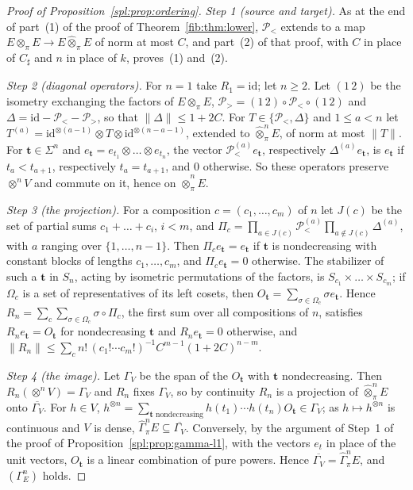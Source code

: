 \documentclass[11pt]{amsart}
\theoremstyle{definition}
\theoremstyle{remark}
\numberwithin{equation}{section}
\newcommand{\id}{\mathrm{id}}
\newcommand{\norm}[1]{\lVert #1\rVert}
\theoremstyle{plain}
\theoremstyle{definition}
\theoremstyle{plain}
\newcommand{\hGamma}{\widehat\Gamma}
\newcommand{\cP}{\mathcal P}
\begin{document}
\begin{proof}[Proof of Proposition~\ref{spl:prop:ordering}]
\emph{Step 1 (source and target).} As at the end of part~(1) of the proof of Theorem~\ref{fib:thm:lower}, $\cP_<$
extends to a map $E\otimes_\pi E\to E\widehat\otimes_\pi E$ of norm at most $C$, and part~(2) of that proof, with $C$ in
place of $C_\sharp$ and $n$ in place of $k$, proves~(1) and~(2).

\emph{Step 2 (diagonal operators).} For $n=1$ take $R_1=\id$; let $n\ge2$. Let $(1\,2)$ be the isometry exchanging the
factors of $E\otimes_\pi E$, $\cP_>=(1\,2)\circ\cP_<\circ(1\,2)$ and $\Delta=\id-\cP_<-\cP_>$, so that
$\norm\Delta\le1+2C$. For $T\in\{\cP_<,\Delta\}$ and $1\le a<n$ let
$T^{(a)}=\id^{\otimes(a-1)}\otimes T\otimes\id^{\otimes(n-a-1)}$, extended to $\widehat\otimes^n_\pi E$, of norm at most
$\norm T$. For $\mathbf t\in\Sigma^n$ and $e_{\mathbf t}=e_{t_1}\otimes\dots\otimes e_{t_n}$, the vector
$\cP_<^{(a)}e_{\mathbf t}$, respectively $\Delta^{(a)}e_{\mathbf t}$, is $e_{\mathbf t}$ if $t_a<t_{a+1}$, respectively
$t_a=t_{a+1}$, and $0$ otherwise. So these operators preserve $\otimes^nV$ and commute on it, hence on
$\widehat\otimes^n_\pi E$.

\emph{Step 3 (the projection).} For a composition $c=(c_1,\dots,c_m)$ of $n$ let $J(c)$ be the set of partial sums
$c_1+\dots+c_i$, $i<m$, and $\Pi_c=\prod_{a\in J(c)}\cP_<^{(a)}\prod_{a\notin J(c)}\Delta^{(a)}$, with $a$ ranging over
$\{1,\dots,n-1\}$. Then $\Pi_ce_{\mathbf t}=e_{\mathbf t}$ if $\mathbf t$ is nondecreasing with constant blocks of
lengths $c_1,\dots,c_m$, and $\Pi_ce_{\mathbf t}=0$ otherwise. The stabilizer of such a $\mathbf t$ in $S_n$, acting by
isometric permutations of the factors, is $S_{c_1}\times\dots\times S_{c_m}$; if $\Omega_c$ is a set of representatives
of its left cosets, then $O_{\mathbf t}=\sum_{\sigma\in\Omega_c}\sigma e_{\mathbf t}$. Hence
$R_n=\sum_c\sum_{\sigma\in\Omega_c}\sigma\circ\Pi_c$, the first sum over all compositions of $n$, satisfies
$R_ne_{\mathbf t}=O_{\mathbf t}$ for nondecreasing $\mathbf t$ and $R_ne_{\mathbf t}=0$ otherwise, and
$\norm{R_n}\le\sum_cn!\,(c_1!\cdots c_m!)^{-1}C^{m-1}(1+2C)^{n-m}$.

\emph{Step 4 (the image).} Let $\Gamma_V$ be the span of the $O_{\mathbf t}$ with $\mathbf t$ nondecreasing. Then
$R_n(\otimes^nV)=\Gamma_V$ and $R_n$ fixes $\Gamma_V$, so by continuity $R_n$ is a projection of
$\widehat\otimes^n_\pi E$ onto $\overline{\Gamma_V}$. For $h\in V$,
$h^{\otimes n}=\sum_{\mathbf t\text{ nondecreasing}}h(t_1)\cdots h(t_n)O_{\mathbf t}\in\Gamma_V$; as
$h\mapsto h^{\otimes n}$ is continuous and $V$ is dense, $\hGamma^n_\pi E\subseteq\overline{\Gamma_V}$. Conversely, by
the argument of Step~1 of the proof of Proposition~\ref{spl:prop:gamma-l1}, with the vectors $e_t$ in place of the unit
vectors, $O_{\mathbf t}$ is a linear combination of pure powers. Hence $\overline{\Gamma_V}=\hGamma^n_\pi E$, and
$(\Gamma^n_E)$ holds.
\end{proof}
\end{document}
